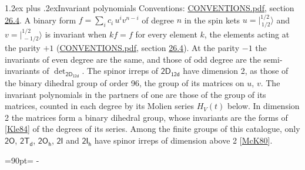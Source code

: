 \documentclass[10pt,a4paper]{article}
\makeatletter
\renewcommand\section{\@startsection{section}{1}{\z@}{-3ex plus -1ex minus -.2ex}%
  {1.2ex plus .2ex}{\normalfont\large\sffamily\bfseries\color{parttitle}}}
\newcommand{\needspace}[1]{\par\penalty-100\begingroup\dimen0=#1\relax\dimen2=\pagegoal
  \advance\dimen2-\pagetotal\ifdim\dimen0>\dimen2\relax\ifdim\dimen2>0pt\vfil\break\fi\fi
  \endgroup}
\numberwithin{equation}{section}
\newcommand{\grp}[1]{\mathsf{#1}}
\newcommand{\jm}[2]{\bigl\lvert{}^{#1}_{\,#2}\bigr\rangle}
\makeatother
\begin{document}
\section{Invariant polynomials}\label{s:invariants}
Conventions: \href{../../CONVENTIONS.pdf}{CONVENTIONS.pdf}, section \href{../../CONVENTIONS.pdf\#conv.26.4}{26.4}.
\leavevmode\label{n:local.binary.form}A binary form $f = \sum_i c_i\, u^i v^{n-i}$ of degree $n$ in the spin kets $u = \jm{1/2}{1/2}$ and $v = \jm{1/2}{-1/2}$ is invariant when $k f = f$ for every element $k$, the elements acting at the parity $+1$ (\href{../../CONVENTIONS.pdf}{CONVENTIONS.pdf}, section \href{../../CONVENTIONS.pdf\#conv.26.4}{26.4}). At the parity $-1$ the invariants of even degree are the same, and those of odd degree are the semi-invariants of $\det_{\grp{2D_{12d}}}$.
The spinor irreps of $\grp{2D_{12d}}$ have dimension 2, as those of the binary dihedral group of order 96, the group of its matrices on $u$, $v$. \label{n:function.hilbert}The invariant polynomials in the partners of one are those of the group of its matrices, counted in each degree by its Molien series $H_V(t)$ below. In dimension 2 the matrices form a binary dihedral group, whose invariants are the forms of [\href{../../../REFERENCES.pdf\#ref.Kle84}{Kle84}] of the degrees of its series. Among the finite groups of this catalogue, only $\grp{2O}$, $\grp{2T_{d}}$, $\grp{2O_{h}}$, $\grp{2I}$ and $\grp{2I_{h}}$ have spinor irreps of dimension above 2 [\href{../../../REFERENCES.pdf\#ref.McK80}{McK80}].
\needspace{90pt}
\end{document}
